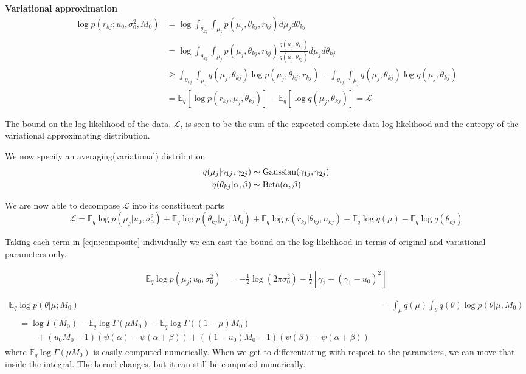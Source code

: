 \documentclass[10pt, letterpaper]{article}
\newcommand{\E}{\mathbb{E}}
\begin{document}
{\bf Variational approximation}
\begin{align}
\log p(r_{kj}; u_0, \sigma_0^2, M_0) & = \log \int_{\theta_{kj}} \int_{\mu_j} p(\mu_j, \theta_{kj}, r_{kj})d\mu_jd\theta_{kj} \\
& = \log \int_{\theta_{kj}} \int_{\mu_j} p(\mu_j, \theta_{kj}, r_{kj}) \frac{q(\mu_j, \theta_{kj})}{q(\mu_j, \theta_{kj})}  d\mu_jd\theta_{kj}\\
& \geq  \int_{\theta_{kj}} \int_{\mu_j} q(\mu_j, \theta_{kj}) \log p(\mu_j, \theta_{kj}, r_{kj}) -  \int_{\theta_{kj}} \int_{\mu_j} q(\mu_j, \theta_{kj}) \log q(\mu_j, \theta_{kj}) \\
& = \E_q \left[ \log p(r_{kj}, \mu_j, \theta_{kj}) \right] - \E_q\left[ \log q(\mu_j, \theta_{kj}) \right] = \mathcal{L}
\end{align}

The bound on the log likelihood of the data, $\mathcal{L}$, is seen to be the sum of the expected complete data log-likelihood and the entropy of the variational approximating distribution.

We now specify an averaging(variational) distribution
\begin{align}
q(\mu_j | \gamma_{1j}, \gamma_{2j}) & \thicksim \text{Gaussian}(\gamma_{1j}, \gamma_{2j})\\
q(\theta_{kj} | \alpha, \beta ) & \thicksim \text{Beta}(\alpha, \beta)
\end{align}

We are now able to decompose $\mathcal{L}$ into its constituent parts
\begin{equation}\label{eqn:composite}
\mathcal{L} = \E_q\log p(\mu_j|u_0,\sigma_0^2) + \E_q \log p(\theta_{kj} | \mu_j; M_0) 
+ \E_q \log p(r_{kj} | \theta_{kj}, n_{kj}) - \E_q \log q(\mu) - \E_q \log q(\theta_{kj})
\end{equation}

Taking each term in \eqref{eqn:composite} individually we can cast the bound on the log-likelihood in terms of original and variational parameters only.

\begin{align}
\E_q \log p(\mu_j ; u_0, \sigma_0^2) & = -\frac{1}{2}\log (2\pi\sigma_0^2) -\frac{1}{2}\left[ \gamma_{2} + (\gamma_1 - u_0)^2 \right]
\end{align}

\begin{align}
\E_q \log p(\theta | \mu ; M_0) & = \int_\mu q(\mu) \int_\theta q(\theta) \log p(\theta | \mu, M_0)\\
\begin{split}
& = \log \Gamma(M_0) - \E_q \log \Gamma(\mu M_0) - \E_q \log \Gamma((1-\mu)M_0) \\
& \qquad+(u_0M_0-1)\left( \psi(\alpha) - \psi(\alpha + \beta) \right) + ((1-u_0)M_0-1)\left( \psi(\beta) - \psi(\alpha + \beta) \right)
\end{split}
\end{align}
where $\E_q \log \Gamma(\mu M_0)$ is easily computed numerically. When we get to differentiating with respect to the parameters, we can move that inside the integral. The kernel changes, but it can still be computed numerically.
\end{document}
